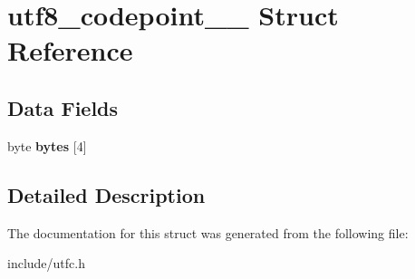 \hypertarget{structutf8__codepoint____}{}\section{utf8\+\_\+codepoint\+\_\+\+\_\+ Struct Reference}
\label{structutf8__codepoint____}
\subsection*{Data Fields}
\begin{DoxyCompactItemize}
\item 
\mbox{\label{structutf8__codepoint_____aec47d6eae54d6661c977467ec5d27bea}} 
byte {\bfseries bytes} \mbox{[}4\mbox{]}
\end{DoxyCompactItemize}


\subsection{Detailed Description}


The documentation for this struct was generated from the following file\+:\begin{DoxyCompactItemize}
\item 
include/utfc.\+h\end{DoxyCompactItemize}

